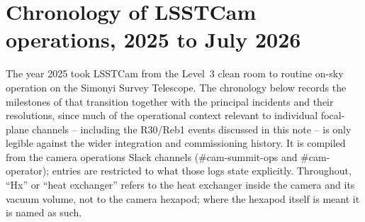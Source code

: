 %
%

\providecommand{\rubintkt}[1]{\href{https://rubinobs.atlassian.net/browse/#1}{#1}}
\providecommand{\slactkt}[1]{\href{https://jira.slac.stanford.edu/browse/#1}{#1}}
\providecommand{\lsstls}[1]{\href{https://ls.st/#1}{#1}}

\section{Chronology of LSSTCam operations, 2025 to July 2026}
\label{sec:chronology}

The year 2025 took LSSTCam from the Level~3 clean room to routine
on-sky operation on the Simonyi Survey Telescope.  The chronology
below records the milestones of that transition together with the
principal incidents and their resolutions, since much of the
operational context relevant to individual focal-plane channels --
including the R30/Reb1 events discussed in this note -- is only
legible against the wider integration and commissioning history.
It is compiled from the camera operations Slack channels
(\#cam-summit-ops and \#cam-operator); entries are restricted to what
those logs state explicitly.  Throughout, ``Hx'' or ``heat exchanger''
refers to the heat exchanger inside the camera and its vacuum volume, not
to the camera hexapod; where the hexapod itself is meant it is named as
such.


